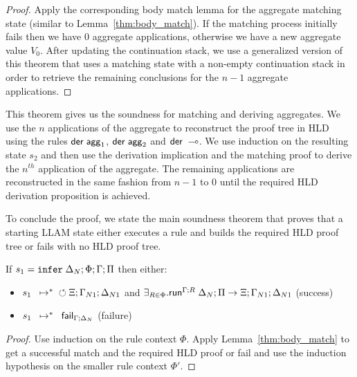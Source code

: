 \begin{proof}
Apply the corresponding body match lemma for the aggregate matching state
(similar to Lemma~\ref{thm:body_match}). If the matching process initially fails then
we have 0 aggregate applications, otherwise we have a new aggregate value $V_0$.
After updating the continuation stack, we use a generalized version of this
theorem that uses a matching state with a non-empty continuation stack
in order to retrieve the remaining conclusions for the $n-1$ aggregate applications.
\end{proof}

This theorem gives us the soundness for matching and deriving aggregates. We
use the $n$ applications of the aggregate to reconstruct the proof tree in HLD
using the rules $\dzname \m{agg}_1$, $\dzname \m{agg}_2$ and $\dzname \lolli$.
We use induction on the resulting state $s_2$ and then use the derivation
implication and the matching proof to derive the $n^{th}$ application of the
aggregate. The remaining applications are reconstructed in the same fashion
from $n-1$ to $0$ until the required HLD derivation proposition is achieved.

To conclude the proof, we state the main soundness theorem that proves that a
starting LLAM state either executes a rule and builds the required HLD proof tree
or fails with no HLD proof tree.

\begin{theorem}[Soundness]\label{thm:soundness}
  If $s_1 = \dostate{\Delta_N}{\Phi}{\Gamma}{\Pi}$
  then either:
  
  \begin{itemize}
        \item $\transs{s_1}{\finalstate{\Xi}{\Gamma_{N1}}{\Delta_{N1}}}$
  and $\exists_{R \in \Phi}. \dozx{\Gamma}{\Delta_N}{\Pi}{R}{\Xi; \Gamma_{N1};
        \Delta_{N1}}$ (success)
  \item $\transs{s_1}{\failstate{\Gamma}{\Delta_N}}$ (failure)
     \end{itemize}
\end{theorem}
\begin{proof}
   Use induction on the rule context $\Phi$. Apply Lemma~\ref{thm:body_match} to
   get a successful match and the required HLD proof or fail and use the
   induction hypothesis on the smaller rule context $\Phi'$.
\end{proof}
